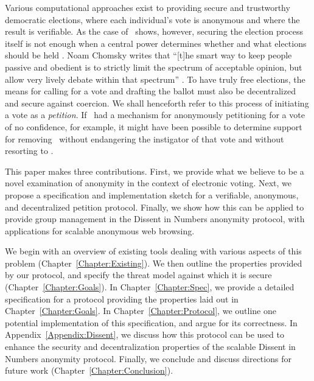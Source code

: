 Various computational approaches exist to providing secure and trustworthy
democratic elections, where each individual's vote is anonymous and where the
result is verifiable. As the case of \Tyrant~shows, however, securing the
election process itself is not enough when a central power determines whether
and what elections should be held .
Noam Chomsky writes that
``[t]he smart way to keep people passive and obedient is to strictly limit the
spectrum of acceptable opinion, but allow very lively debate within that
spectrum'' \cite{chomsky1998common}. To have truly free elections, the means for
calling for a vote and drafting the ballot must also be decentralized and secure
against coercion. We shall henceforth refer to this process of initiating a vote
as a \emph{petition}. If \Congress~had a mechanism for anonymously petitioning
for a vote of no confidence, for example, it might have been possible to
determine support for removing \Tyrant~without endangering the instigator of
that vote and without resorting to \War.
%

This paper makes three contributions. First, we provide what we believe to be
a novel examination of anonymity in the context of electronic voting. Next, we
propose a specification and implementation sketch for a verifiable, anonymous,
and decentralized petition protocol. Finally, we show how this can be applied to
provide group management in the Dissent in Numbers\cite{din} anonymity protocol,
with applications for scalable anonymous web browsing.

We begin with an overview of existing tools dealing with various aspects of this
problem (Chapter~\ref{Chapter:Existing}).  We then outline the properties
provided by our protocol, and specify the threat
model against which it is secure (Chapter~\ref{Chapter:Goals}).  In
Chapter~\ref{Chapter:Spec}, we provide a detailed specification for a protocol
providing the properties laid out in Chapter~\ref{Chapter:Goals}. In
Chapter~\ref{Chapter:Protocol}, we outline one potential implementation of this
specification, and argue for its correctness.
In Appendix~\ref{Appendix:Dissent}, we discuss how this protocol can be used to
enhance the security and decentralization properties of the scalable Dissent in
Numbers anonymity protocol. Finally, we conclude and discuss directions for
future work (Chapter~\ref{Chapter:Conclusion}).

